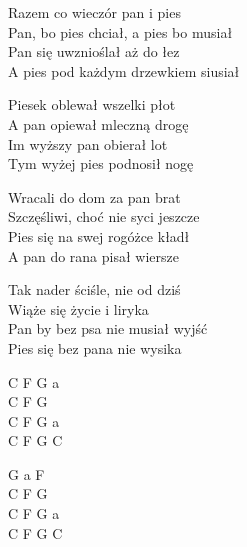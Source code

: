 \begin{text}
    Razem co wieczór pan i pies\\
    Pan, bo pies chciał, a pies bo musiał\\
    Pan się uwznioślał aż do łez\\
    A pies pod każdym drzewkiem siusiał

    \vin Piesek oblewał wszelki płot\\
    \vin A pan opiewał mleczną drogę\\
    \vin Im wyższy pan obierał lot\\
    \vin Tym wyżej pies podnosił nogę

    Wracali do dom za pan brat\\
    Szczęśliwi, choć nie syci jeszcze\\
    Pies się na swej rogóżce kładł\\
    A pan do rana pisał wiersze

    \vin Tak nader ściśle, nie od dziś\\
    \vin Wiąże się życie i liryka\\
    \vin Pan by bez psa nie musiał wyjść\\
    \vin Pies się bez pana nie wysika
\end{text}
\begin{chord}
    C F G a\\
    C F G\\
    C F G a\\
    C F G C

    G a F\\
    C F G\\
    C F G a\\
    C F G C
\end{chord}
